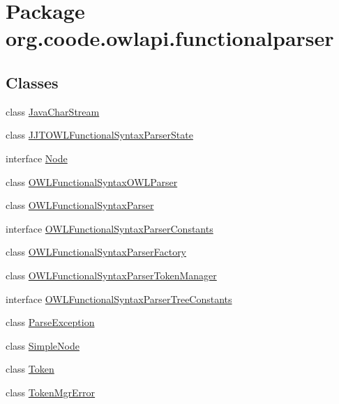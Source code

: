 \hypertarget{namespaceorg_1_1coode_1_1owlapi_1_1functionalparser}{\section{Package org.\-coode.\-owlapi.\-functionalparser}
\label{namespaceorg_1_1coode_1_1owlapi_1_1functionalparser}
}
\subsection*{Classes}
\begin{DoxyCompactItemize}
\item 
class \hyperlink{classorg_1_1coode_1_1owlapi_1_1functionalparser_1_1_java_char_stream}{Java\-Char\-Stream}
\item 
class \hyperlink{classorg_1_1coode_1_1owlapi_1_1functionalparser_1_1_j_j_t_o_w_l_functional_syntax_parser_state}{J\-J\-T\-O\-W\-L\-Functional\-Syntax\-Parser\-State}
\item 
interface \hyperlink{interfaceorg_1_1coode_1_1owlapi_1_1functionalparser_1_1_node}{Node}
\item 
class \hyperlink{classorg_1_1coode_1_1owlapi_1_1functionalparser_1_1_o_w_l_functional_syntax_o_w_l_parser}{O\-W\-L\-Functional\-Syntax\-O\-W\-L\-Parser}
\item 
class \hyperlink{classorg_1_1coode_1_1owlapi_1_1functionalparser_1_1_o_w_l_functional_syntax_parser}{O\-W\-L\-Functional\-Syntax\-Parser}
\item 
interface \hyperlink{interfaceorg_1_1coode_1_1owlapi_1_1functionalparser_1_1_o_w_l_functional_syntax_parser_constants}{O\-W\-L\-Functional\-Syntax\-Parser\-Constants}
\item 
class \hyperlink{classorg_1_1coode_1_1owlapi_1_1functionalparser_1_1_o_w_l_functional_syntax_parser_factory}{O\-W\-L\-Functional\-Syntax\-Parser\-Factory}
\item 
class \hyperlink{classorg_1_1coode_1_1owlapi_1_1functionalparser_1_1_o_w_l_functional_syntax_parser_token_manager}{O\-W\-L\-Functional\-Syntax\-Parser\-Token\-Manager}
\item 
interface \hyperlink{interfaceorg_1_1coode_1_1owlapi_1_1functionalparser_1_1_o_w_l_functional_syntax_parser_tree_constants}{O\-W\-L\-Functional\-Syntax\-Parser\-Tree\-Constants}
\item 
class \hyperlink{classorg_1_1coode_1_1owlapi_1_1functionalparser_1_1_parse_exception}{Parse\-Exception}
\item 
class \hyperlink{classorg_1_1coode_1_1owlapi_1_1functionalparser_1_1_simple_node}{Simple\-Node}
\item 
class \hyperlink{classorg_1_1coode_1_1owlapi_1_1functionalparser_1_1_token}{Token}
\item 
class \hyperlink{classorg_1_1coode_1_1owlapi_1_1functionalparser_1_1_token_mgr_error}{Token\-Mgr\-Error}
\end{DoxyCompactItemize}
